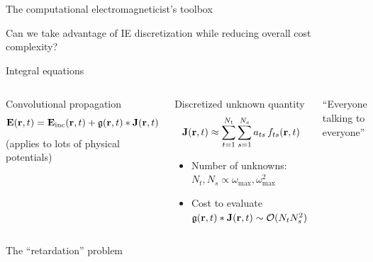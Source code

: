 \documentclass[aspectratio=169, usenames, dvipsnames]{beamer}
\begin{document}
\begin{frame}{The computational electromagneticist's toolbox}
    \vspace{-0.5cm}
      \begin{center}
        
      \end{center}
    \vspace{-1cm}
    Can we take advantage of IE discretization while reducing overall cost complexity?
\end{frame}

\begin{frame}{Integral equations}
  \begin{columns}
    \begin{block}{Convolutional propagation}
      \begin{equation*}
        \vb{E}(\vb{r}, t) = \vb{E}_\text{inc}(\vb{r}, t) + \mathfrak{g}(\vb{r}, t) * \vb{J}(\vb{r}, t)
      \end{equation*}
      \hfill \tiny{(applies to lots of physical potentials)}
    \end{block}

    \begin{block}{Discretized unknown quantity}
      \begin{equation*}
        \vb{J}(\vb{r}, t) \approx \sum_{t=1}^{N_t} \sum_{s=1}^{N_s} a_{ts} \, f_{ts}(\vb{r}, t)
      \end{equation*}
      \begin{itemize}
        \item Number of unknowns: $N_t, N_s \propto \omega_\text{max}, \omega_\text{max}^2$
        \item Cost to evaluate $\mathfrak{g}(\vb{r}, t) * \vb{J}(\vb{r}, t) \sim \mathcal{O}(N_t N_s^2)$
      \end{itemize}
    \end{block}

      \begin{center}
        
        {\small ``Everyone talking to everyone''}
      \end{center}
  \end{columns}
\end{frame}

\begin{frame}{The ``retardation'' problem}
  \begin{center}
    
  \end{center}
\end{frame}
\end{document}
